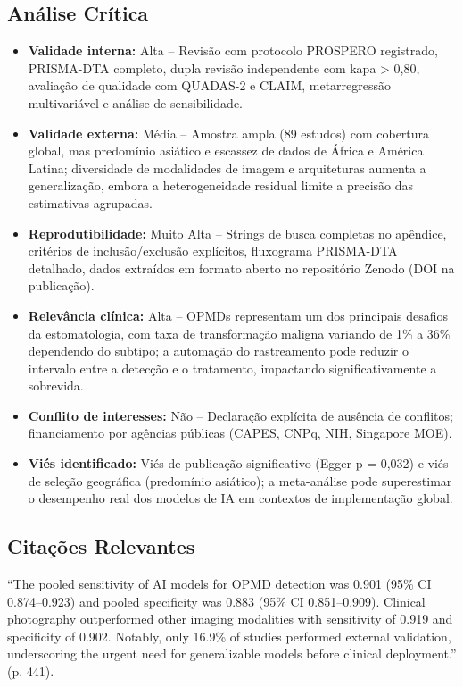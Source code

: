 \subsection{Análise Crítica}
\begin{itemize}
  \item \textbf{Validade interna:} Alta -- Revisão com protocolo
        PROSPERO registrado, PRISMA-DTA completo, dupla revisão
        independente com kapa > 0,80, avaliação de qualidade com
        QUADAS-2 e CLAIM, metarregressão multivariável e análise de
        sensibilidade.
  \item \textbf{Validade externa:} Média -- Amostra ampla (89 estudos)
        com cobertura global, mas predomínio asiático e escassez de
        dados de África e América Latina; diversidade de modalidades
        de imagem e arquiteturas aumenta a generalização, embora a
        heterogeneidade residual limite a precisão das estimativas
        agrupadas.
  \item \textbf{Reprodutibilidade:} Muito Alta -- Strings de busca
        completas no apêndice, critérios de inclusão/exclusão
        explícitos, fluxograma PRISMA-DTA detalhado, dados extraídos
        em formato aberto no repositório Zenodo (DOI na publicação).
  \item \textbf{Relevância clínica:} Alta -- OPMDs representam um dos
        principais desafios da estomatologia, com taxa de transformação
        maligna variando de 1\% a 36\% dependendo do subtipo; a
        automação do rastreamento pode reduzir o intervalo entre a
        detecção e o tratamento, impactando significativamente a
        sobrevida.
  \item \textbf{Conflito de interesses:} Não -- Declaração explícita
        de ausência de conflitos; financiamento por agências públicas
        (CAPES, CNPq, NIH, Singapore MOE).
  \item \textbf{Viés identificado:} Viés de publicação significativo
        (Egger p = 0,032) e viés de seleção geográfica (predomínio
        asiático); a meta-análise pode superestimar o desempenho real
        dos modelos de IA em contextos de implementação global.
\end{itemize}

\subsection{Citações Relevantes}
\begin{citacao}
``The pooled sensitivity of AI models for OPMD detection was 0.901
(95\% CI 0.874--0.923) and pooled specificity was 0.883 (95\% CI
0.851--0.909). Clinical photography outperformed other imaging
modalities with sensitivity of 0.919 and specificity of 0.902.
Notably, only 16.9\% of studies performed external validation,
underscoring the urgent need for generalizable models before clinical
deployment.'' (p. 441).
\end{citacao}

